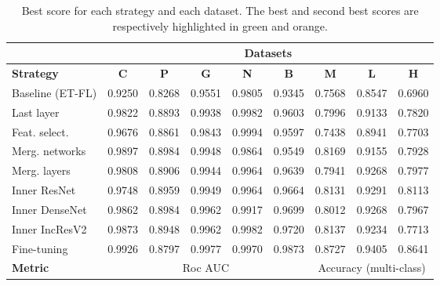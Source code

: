  
 
\begin{table*}
	\center
    \small
    \begin{tabular}{|l||c|c|c|c|c||c|c|c|}   
      \hline 
      & \multicolumn{8}{c|}{\textbf{Datasets}} \\
      \hline 
      \textbf{Strategy} & \textbf{C} & \textbf{P} & \textbf{G} & \textbf{N} & \textbf{B} & \textbf{M} & \textbf{L} & \textbf{H} \\
      \hline
      Baseline (ET-FL)      & 0.9250 & 0.8268 & 0.9551 & 0.9805	& 0.9345 & 0.7568 & 0.8547 & 0.6960 \\
      Last layer    & 0.9822 & 0.8893 & 0.9938 & \cellcolor{Dandelion}0.9982 & 0.9603 & 0.7996 & 0.9133	& 0.7820 \\
      Feat. select.	& 0.9676	& 0.8861	& 0.9843	& \cellcolor{LimeGreen}0.9994	& 0.9597	& 0.7438	& 0.8941	& 0.7703 \\
      Merg. networks	& \cellcolor{Dandelion}0.9897	& \cellcolor{LimeGreen}0.8984	& 0.9948	& 0.9864	& 0.9549	& \cellcolor{Dandelion}0.8169	& 0.9155	& 0.7928 \\
      Merg. layers	& 0.9808	& 0.8906	& 0.9944	& 0.9964	& 0.9639	& 0.7941	& 0.9268	& 0.7977 \\
      Inner ResNet	& 0.9748	& \cellcolor{Dandelion}0.8959	& 0.9949	& 0.9964	& 0.9664	& 0.8131	& \cellcolor{Dandelion}0.9291	& \cellcolor{Dandelion}0.8113 \\
      Inner DenseNet	& 0.9862	& \cellcolor{LimeGreen}0.8984	& \cellcolor{Dandelion}0.9962	& 0.9917	& 0.9699	& 0.8012	& 0.9268	& 0.7967 \\
      Inner IncResV2	& 0.9873	& 0.8948	& \cellcolor{Dandelion}0.9962	& \cellcolor{Dandelion}0.9982	& \cellcolor{Dandelion}0.9720	& 0.8137	& 0.9234	& 0.7713 \\
       Fine-tuning		& \cellcolor{LimeGreen}0.9926	& 0.8797	& \cellcolor{LimeGreen}0.9977	& 0.9970	& \cellcolor{LimeGreen}0.9873	& \cellcolor{LimeGreen}0.8727	& \cellcolor{LimeGreen}0.9405	& \cellcolor{LimeGreen}0.8641 \\
      \hline
      \textbf{Metric} & \multicolumn{5}{c||}{Roc AUC} & \multicolumn{3}{c|}{Accuracy (multi-class)} \\
      \hline
	\end{tabular}
      \caption{Best score for each strategy and each dataset. The best and second best scores are respectively highlighted in green and orange.}
    \label{tab:comp:res_best_scores_per_strategy}
\end{table*}



